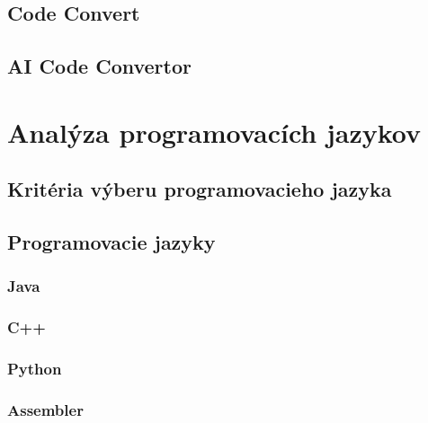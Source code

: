 \section{Code Convert}
\section{AI Code Convertor}

\chapter{Analýza programovacích jazykov}
\section{Kritéria výberu programovacieho jazyka}
\section{Programovacie jazyky}
\subsection{Java}
\subsection{C++}
\subsection{Python}
\subsection{Assembler}


